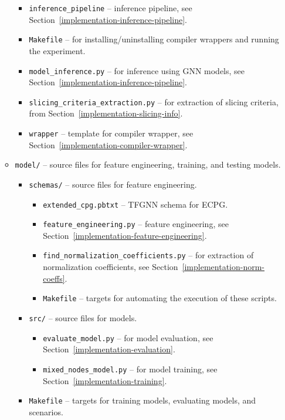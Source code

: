 \begin{itemize}
\begin{itemize}
\begin{itemize}
            \item \texttt{inference\_pipeline} -- inference pipeline, see Section~\ref{implementation-inference-pipeline}.
            \item \texttt{Makefile} -- for installing/uninstalling compiler wrappers and running the experiment.
            \item \texttt{model\_inference.py} -- for inference using GNN models, see Section~\ref{implementation-inference-pipeline}.
            \item \texttt{slicing\_criteria\_extraction.py} -- for extraction of slicing criteria, from Section~\ref{implementation-slicing-info}.
            \item \texttt{wrapper} -- template for compiler wrapper, see Section~\ref{implementation-compiler-wrapper}.
        \end{itemize}
        \item \texttt{model/} -- source files for feature engineering, training, and testing models.
        \begin{itemize}
            \item \texttt{schemas/} -- source files for feature engineering.
            \begin{itemize}
                \item \texttt{extended\_cpg.pbtxt} -- TFGNN schema for ECPG.
                \item \texttt{feature\_engineering.py} -- feature engineering, see Section~\ref{implementation-feature-engineering}.
                \item \texttt{find\_normalization\_coefficients.py} -- for extraction of normalization coefficients, see Section~\ref{implementation-norm-coeffs}.
                \item \texttt{Makefile} -- targets for automating the execution of these scripts.
            \end{itemize}
            \item \texttt{src/} -- source files for models.
            \begin{itemize}
                \item \texttt{evaluate\_model.py} -- for model evaluation, see Section~\ref{implementation-evaluation}.
                \item \texttt{mixed\_nodes\_model.py} -- for model training, see Section~\ref{implementation-training}.
            \end{itemize}
            \item \texttt{Makefile} -- targets for training models, evaluating models, and scenarios.

\end{itemize}
\end{itemize}
\end{itemize}
